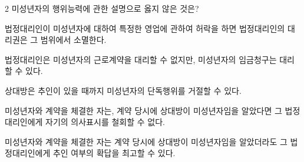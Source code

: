 \begin{question}{2}
미성년자의 행위능력에 관한 설명으로 옳지 않은 것은?
\begin{choices}
  \item 법정대리인이 미성년자에 대하여 특정한 영업에 관하여 허락을 하면 법정대리인의 대리권은 그 범위에서 소멸한다.
  \item 법정대리인은 미성년자의 근로계약을 대리할 수 없지만, 미성년자의 임금청구는 대리할 수 있다.
  \item 상대방은 추인이 있을 때까지 미성년자의 단독행위를 거절할 수 있다.
  \item 미성년자와 계약을 체결한 자는, 계약 당시에 상대방이 미성년자임을 알았다면 그 법정대리인에게 자기의 의사표시를 철회할 수 없다.
  \item 미성년자와 계약을 체결한 자는 계약 당시에 상대방이 미성년자임을 알았더라도 그 법정대리인에게 추인 여부의 확답을 최고할 수 있다.
\end{choices}
\end{question}
